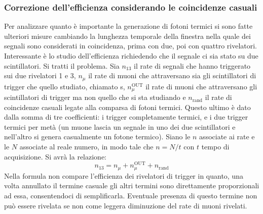\subsubsection{Correzione dell'efficienza considerando le coincidenze casuali}
\label{sec:eff_corr}
Per analizzare quanto è importante la generazione di fotoni termici si sono fatte ulteriori misure cambiando la lunghezza temporale della finestra nella quale dei segnali sono considerati in coincidenza, prima con due, poi con quattro rivelatori.
Interessante è lo studio dell'efficienza richiedendo che il segnale ci sia stato su due scintillatori. 
Si tratti il problema. Sia $n_{13}$ il rate di segnali che hanno triggerato sui due rivelatori 1 e 3, $n_\mu$ il rate di muoni che attraversano sia gli scintillatori di trigger che quello studiato, chiamato s, $n_\mu^\text{OUT}$ il rate di muoni che attraversano gli scintillatori di trigger ma non quello che si sta studiando e $n_\text{rand}$ il rate di coincidenze casuali legate alla comparsa di fotoni termici. Questo ultimo è dato dalla somma di tre coefficienti: i trigger completamente termici, e i due trigger termici per metà (un muone lascia un segnale in uno dei due scintillatori e nell'altro si genera casualmente un fotone termico). 
Siano le $n$ associate ai rate e le $N$ associate al reale numero, in modo tale che $n=N/t$ con $t$ tempo di acquisizione. Si avrà la relazione:
\begin{equation}
  n_{13} = n_\mu + n_\mu^\text{OUT} + n_\text{rand}
\end{equation}
Nella formula non compare l'efficienza dei rivelatori di trigger in quanto, una volta annullato il termine casuale gli altri termini sono direttamente proporzionali ad essa, consentendoci di semplificarla. Eventuale presenza di questo termine non pu\`o essere rivelata se non come leggera diminuzione del rate di muoni rivelati.

